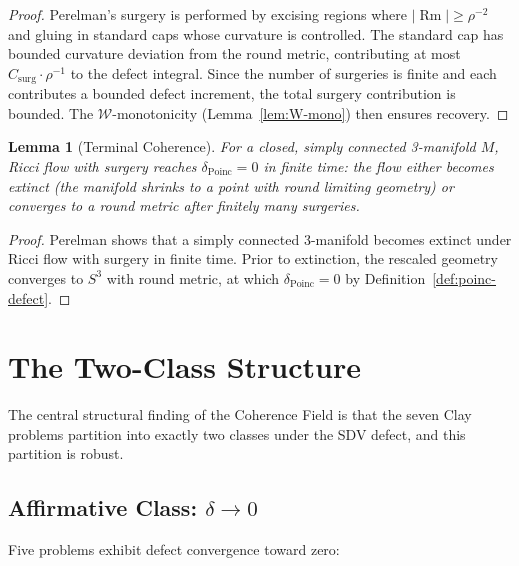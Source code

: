 \documentclass[11pt]{article}
\newtheorem{lemma}[theorem]{Lemma}
\DeclareMathOperator{\Rm}{Rm}
\begin{document}
\begin{proof}
Perelman's surgery is performed by excising regions where
$|\Rm| \geq \rho^{-2}$ and gluing in standard caps whose curvature
is controlled.  The standard cap has bounded curvature deviation from
the round metric, contributing at most $C_{\mathrm{surg}} \cdot
\rho^{-1}$ to the defect integral.  Since the number of surgeries is
finite \cite{Per2} and each contributes a bounded defect increment,
the total surgery contribution is bounded.  The $\mathcal{W}$-monotonicity
(Lemma~\ref{lem:W-mono}) then ensures recovery.
\end{proof}

\begin{lemma}[Terminal Coherence]
\label{lem:terminal}
For a closed, simply connected 3-manifold $M$, Ricci flow with surgery
reaches $\delta_{\mathrm{Poinc}} = 0$ in finite time: the flow either
becomes extinct (the manifold shrinks to a point with round limiting
geometry) or converges to a round metric after finitely many surgeries.
\end{lemma}

\begin{proof}
Perelman \cite{Per3} shows that a simply connected 3-manifold becomes
extinct under Ricci flow with surgery in finite time.  Prior to
extinction, the rescaled geometry converges to $S^3$ with round metric,
at which $\delta_{\mathrm{Poinc}} = 0$ by Definition~\ref{def:poinc-defect}.
\end{proof}

\section{The Two-Class Structure}
\label{sec:two-class}

The central structural finding of the Coherence Field is that
the seven Clay problems partition into exactly two classes under
the SDV defect, and this partition is robust.

\subsection{Affirmative Class: $\delta \to 0$}
\label{subsec:affirm}

Five problems exhibit defect convergence toward zero:
\end{document}
